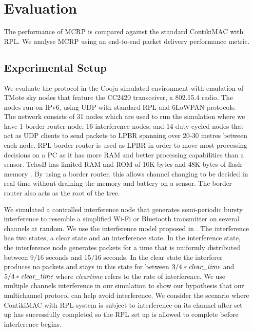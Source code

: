 \section{Evaluation}
\label{sec:evaluation}
The performance of MCRP is compared against the standard ContikiMAC with RPL. We analyse MCRP using an end-to-end packet delivery performance metric.

\subsection{Experimental Setup}
We evaluate the protocol in the  Cooja simulated environment with emulation of TMote sky nodes that feature the CC2420 transceiver, a 802.15.4 radio. The nodes run on IPv6, using UDP with standard RPL and 6LoWPAN protocols. The network consists of 31 nodes which are used to run the simulation where we have 1 border router node, 16 interference nodes, and 14 duty cycled nodes that act as UDP clients to send packets to LPBR spanning over 20-30 metres between each node. RPL border router is used as LPBR in order to move most processing decisions on a PC as it has more RAM and better processing capabilities than a sensor. TelosB has limited RAM and ROM of 10K bytes and 48K bytes of flash memory \cite{telosb-datasheet}. By using a border router, this allows channel changing to be decided in real time without draining the memory and battery on a sensor. The border router also acts as the root of the tree.

We simulated a controlled interference node that generates semi-periodic bursty interference to resemble a simplified Wi-Fi or Bluetooth transmitter on several channels at random. We use the interference model proposed in \cite{Boano:2010:MSM:2127940.2127963}. The interference has two states, a clear state and an interference state. 
In the interference state, the interference node generates packets for a time that is uniformly distributed between $9/16$ seconds and $15/16$ seconds. In the clear state the interferer produces no packets and stays in this state for between $3/4 * \emph{clear\textunderscore time}$ and $5/4 * \emph{clear\textunderscore time}$ where \emph{clear\textunderscore time} refers to the rate of interference.
We use multiple channels interference in our simulation to show our hypothesis that our multichannel protocol can help avoid interference. We consider the scenario where ContikiMAC with RPL system is subject to interference on its channel after set up has successfully completed so the RPL set up is allowed to complete before interference begins.

